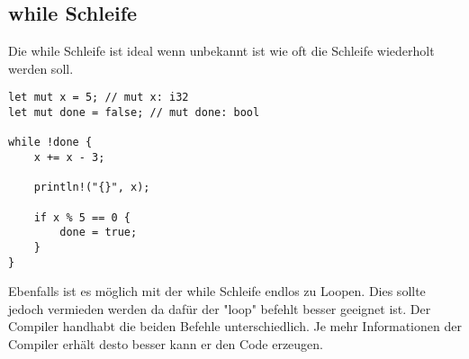 \subsection{while Schleife}
Die while Schleife ist ideal wenn unbekannt ist wie oft die Schleife wiederholt werden soll.

\begin{lstlisting}
let mut x = 5; // mut x: i32
let mut done = false; // mut done: bool

while !done {
	x += x - 3;

	println!("{}", x);

	if x % 5 == 0 {
		done = true;
	}
}
\end{lstlisting}

Ebenfalls ist es möglich mit der while Schleife endlos zu Loopen. Dies sollte jedoch vermieden werden da dafür der "loop" befehlt besser geeignet ist. Der Compiler handhabt die beiden Befehle unterschiedlich. Je mehr Informationen der Compiler erhält desto besser kann er den Code erzeugen.